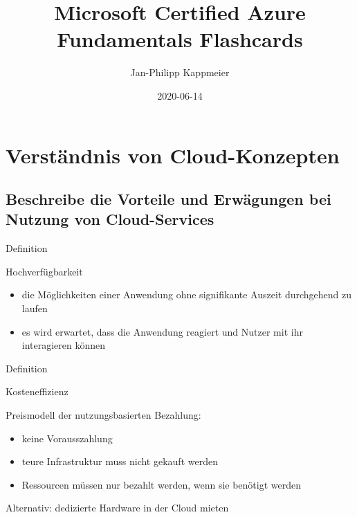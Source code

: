 \documentclass{scrartcl}
\newenvironment{flashcard}[2][]{%
    #1
    \vfill
    \centerline{\Large{#2}}
    \vfill
\newpage
}
{\newpage}
\newcommand{\sectioncard}[1]{
    \vspace*{\stretch{1}}
    \section{#1}
    \vspace*{\stretch{1}}
    \pagebreak
}
\newcommand{\subsectioncard}[1]{
    \vspace*{\stretch{1}}
    \subsection{#1}
    \vspace*{\stretch{1}}
    \pagebreak
}
\begin{document}
    \title{Microsoft Certified Azure Fundamentals Flashcards}
    \date{2020-06-14}
    \author{Jan-Philipp Kappmeier}

    \clearpage\maketitle
    \thispagestyle{empty}
    \pagebreak

    \sectioncard{Verständnis von Cloud-Konzepten}

    \subsectioncard{Beschreibe die Vorteile und Erwägungen bei Nutzung von Cloud-Services}

    \begin{flashcard}[Definition]{Hochverfügbarkeit}
        \begin{itemize}
            \item die Möglichkeiten einer Anwendung ohne signifikante Auszeit durchgehend zu laufen
            \item es wird erwartet, dass die Anwendung reagiert und Nutzer mit ihr interagieren können
        \end{itemize}
    \end{flashcard}

    \begin{flashcard}[Definition]{Kosteneffizienz}
        Preismodell der nutzungsbasierten Bezahlung:
        \begin{itemize}
            \item keine Vorausszahlung
            \item teure Infrastruktur muss nicht gekauft werden
            \item Ressourcen müssen nur bezahlt werden, wenn sie benötigt werden
        \end{itemize}

        \vspace{5mm}
        Alternativ: dedizierte Hardware in der Cloud mieten
    \end{flashcard}
\end{document}
